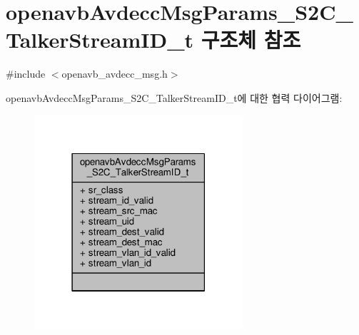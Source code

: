 \hypertarget{structopenavb_avdecc_msg_params___s2_c___talker_stream_i_d__t}{}\section{openavb\+Avdecc\+Msg\+Params\+\_\+\+S2\+C\+\_\+\+Talker\+Stream\+I\+D\+\_\+t 구조체 참조}
\label{structopenavb_avdecc_msg_params___s2_c___talker_stream_i_d__t}


{\ttfamily \#include $<$openavb\+\_\+avdecc\+\_\+msg.\+h$>$}



openavb\+Avdecc\+Msg\+Params\+\_\+\+S2\+C\+\_\+\+Talker\+Stream\+I\+D\+\_\+t에 대한 협력 다이어그램\+:
\nopagebreak
\begin{figure}[H]
\begin{center}
\leavevmode
\includegraphics[width=219pt]{structopenavb_avdecc_msg_params___s2_c___talker_stream_i_d__t__coll__graph}
\end{center}
\end{figure}

